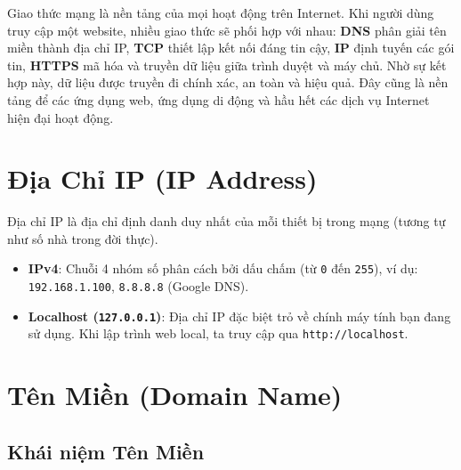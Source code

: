 \documentclass[11pt,oneside]{book}
\newcommand{\codeinline}[1]{\textcolor{accentOrange}{\texttt{#1}}}
\begin{document}
\begin{noteBox}
Giao thức mạng là nền tảng của mọi hoạt động trên Internet. Khi người dùng truy cập một website, nhiều giao thức sẽ phối hợp với nhau: \textbf{DNS} phân giải tên miền thành địa chỉ IP, \textbf{TCP} thiết lập kết nối đáng tin cậy, \textbf{IP} định tuyến các gói tin, \textbf{HTTPS} mã hóa và truyền dữ liệu giữa trình duyệt và máy chủ. Nhờ sự kết hợp này, dữ liệu được truyền đi chính xác, an toàn và hiệu quả. Đây cũng là nền tảng để các ứng dụng web, ứng dụng di động và hầu hết các dịch vụ Internet hiện đại hoạt động.
\end{noteBox}

\section{Địa Chỉ IP (IP Address)}
\label{sec:ip_address}

Địa chỉ IP là địa chỉ định danh duy nhất của mỗi thiết bị trong mạng (tương tự như số nhà trong đời thực). 

\begin{itemize}[leftmargin=1.8em, itemsep=2pt, parsep=0pt]
    \item \textbf{IPv4}: Chuỗi 4 nhóm số phân cách bởi dấu chấm (từ \codeinline{0} đến \codeinline{255}), ví dụ: \codeinline{192.168.1.100}, \codeinline{8.8.8.8} (Google DNS).
    \item \textbf{Localhost (\codeinline{127.0.0.1})}: Địa chỉ IP đặc biệt trỏ về chính máy tính bạn đang sử dụng. Khi lập trình web local, ta truy cập qua \codeinline{http://localhost}.
\end{itemize}

\section{Tên Miền (Domain Name)}
\label{sec:domain_name_deep_dive}

\subsection{Khái niệm Tên Miền}
\end{document}
